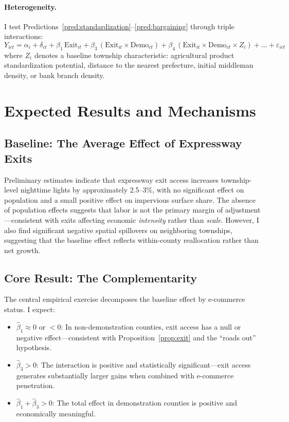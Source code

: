 \documentclass[12pt]{article}
\begin{document}
\paragraph{Heterogeneity.} I test Predictions~\ref{pred:standardization}--\ref{pred:bargaining} through triple interactions:
\begin{equation}
    Y_{ict} = \alpha_i + \delta_{ct} + \beta_1 \, \text{Exit}_{it} + \beta_3 \, (\text{Exit}_{it} \times \text{Demo}_{ct}) + \beta_4 \, (\text{Exit}_{it} \times \text{Demo}_{ct} \times Z_i) + \ldots + \varepsilon_{ict}
\end{equation}
where $Z_i$ denotes a baseline township characteristic: agricultural product standardization potential, distance to the nearest prefecture, initial middleman density, or bank branch density.


\section{Expected Results and Mechanisms}\label{sec:results}

\subsection{Baseline: The Average Effect of Expressway Exits}

Preliminary estimates indicate that expressway exit access increases township-level nighttime lights by approximately 2.5--3\%, with no significant effect on population and a small positive effect on impervious surface share. The absence of population effects suggests that labor is not the primary margin of adjustment---consistent with exits affecting economic \textit{intensity} rather than \textit{scale}. However, I also find significant negative spatial spillovers on neighboring townships, suggesting that the baseline effect reflects within-county reallocation rather than net growth.

\subsection{Core Result: The Complementarity}

The central empirical exercise decomposes the baseline effect by e-commerce status. I expect:

\begin{itemize}[nosep]
    \item $\hat\beta_1 \approx 0$ or $< 0$: In non-demonstration counties, exit access has a null or negative effect---consistent with Proposition~\ref{prop:exit} and the ``roads out'' hypothesis.
    \item $\hat\beta_3 > 0$: The interaction is positive and statistically significant---exit access generates substantially larger gains when combined with e-commerce penetration.
    \item $\hat\beta_1 + \hat\beta_3 > 0$: The total effect in demonstration counties is positive and economically meaningful.
\end{itemize}
\end{document}
